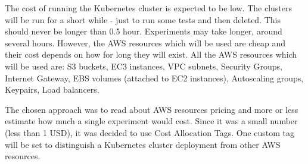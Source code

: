 The cost of running the Kubernetes cluster is expected to be low. The clusters will be run for a short while - just to run some tests and then deleted. This should never be longer than 0.5 hour. Experiments may take longer, around several hours. However, the AWS resources which will be used are cheap and their cost depends on how for long they will exist. All the AWS resources which will be used are: S3 buckets, EC3 instances, VPC subnets, Security Groups, Internet Gateway, EBS volumes (attached to EC2 instances), Autoscaling groups, Keypairs, Load balancers.

The chosen approach was to read about AWS resources pricing and more or less estimate how much a single experiment would cost. Since it was a small number (less than 1 USD), it was decided to use Cost Allocation Tags\cite{amazon-cost-tags}. One custom tag will be set to distinguish a Kubernetes cluster deployment from other AWS resources.

